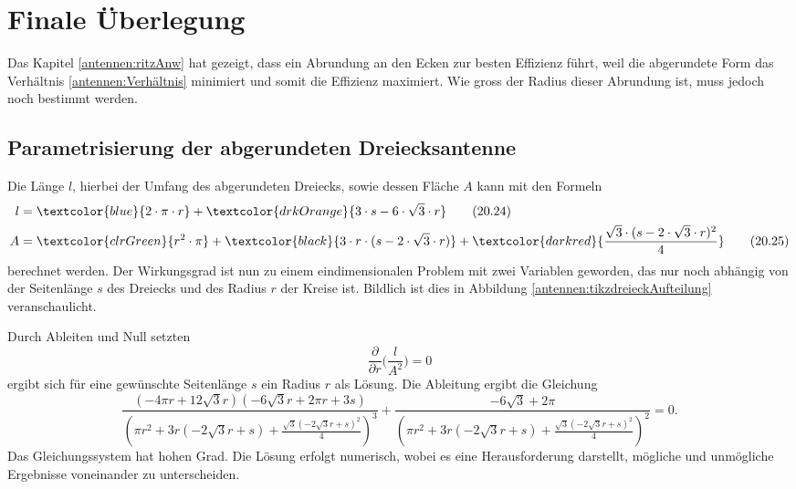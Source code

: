 %
%
% 
%
%
\section{Finale Überlegung\label{antennen:resultat}}

Das Kapitel \ref{antennen:ritzAnw} hat gezeigt, dass ein Abrundung an den Ecken
zur besten Effizienz führt, weil die abgerundete Form das Verhältnis \eqref{antennen:Verhältnis}
minimiert und somit die Effizienz maximiert. Wie gross der Radius dieser Abrundung
ist, muss jedoch noch bestimmt werden.


\subsection{Parametrisierung der abgerundeten Dreiecksantenne\label{antennen:param3eck}}
Die Länge $l$, hierbei der Umfang 
des abgerundeten Dreiecks, sowie dessen Fläche $A$ kann mit den Formeln
\begin{align}
	l &= \textcolor{blue}{2 \cdot \pi \cdot r} + \textcolor{drkOrange}{3 \cdot s - 6 \cdot \sqrt{3} \cdot r} \tag{20.24} \label{antennen:Länge} \\
	A &= \textcolor{clrGreen}{r^2 \cdot \pi} + \textcolor{black}{3 \cdot r \cdot (s - 2 \cdot \sqrt{3} \cdot r)} + \textcolor{darkred}{\frac{\sqrt{3} \cdot (s - 2 \cdot \sqrt{3} \cdot r)^2}{4}} \tag{20.25} \label{antennen:Fläche}
\end{align}\setcounter{equation}{25}%
berechnet werden.
Der Wirkungsgrad ist nun zu einem eindimensionalen Problem mit zwei Variablen geworden, das nur noch abhängig von 
der Seitenlänge $s$ des Dreiecks und des Radius $r$ der Kreise ist. Bildlich ist dies 
in Abbildung \ref{antennen:tikzdreieckAufteilung} veranschaulicht.


Durch Ableiten und Null setzten
\begin{equation}
	\frac{\partial}{\partial{r}} \bigg(\frac{l}{A^2}\bigg)=0
	\label{antennen:Ableitung}
\end{equation}
ergibt sich für eine gewünschte Seitenlänge $s$ ein Radius $r$ als Lösung. 
Die Ableitung ergibt die Gleichung 
\begin{equation}
	\frac{(- 4 \pi r + 12 \sqrt{3} r) (- 6 \sqrt{3} r + 2 \pi r + 3 s)}{\left(\pi r^{2} + 3 r (- 2 \sqrt{3} r + s) + \frac{\sqrt{3} \left(- 2 \sqrt{3} r + s\right)^{2}}{4}\right)^{3}} + \frac{- 6 \sqrt{3} + 2 \pi}{\left(\pi r^{2} + 3 r (- 2 \sqrt{3} r + s) + \frac{\sqrt{3} \left(- 2 \sqrt{3} r + s\right)^{2}}{4}\right)^{2}}=0.
	\label{antennen:Ableitunggelöst}
\end{equation}
Das Gleichungssystem hat hohen Grad. Die Lösung erfolgt numerisch, 
wobei es eine Herausforderung darstellt, mögliche und unmögliche Ergebnisse voneinander zu unterscheiden.


